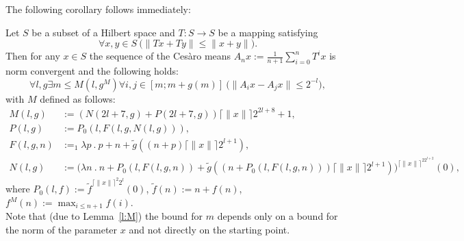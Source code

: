 The following corollary follows immediately:
\begin{cor} \label{c:fin21}
Let $S$ be a subset of a Hilbert space and $T:S\to S$
be a mapping satisfying
\[
\forall x,y\in S\ \big(\| Tx + Ty \| \leq \|x + y\|\big).
\]
Then for any $x\in S$ the sequence of the Ces{\`a}ro means
$
A_nx:=\frac{1}{n+1}\sum^{n}_{i=0} T^i x
$
is norm convergent and the following holds:
\[
\forall l,g \exists m\leq M(l,g^M)\forall i,j\in[m;m+g(m)]\ \big( \|A_{i}x-A_{j}x\|\leq 2^{-l}\big ),
\]
with $M$ defined as follows:
\begin{align*}
M(l,g)&:=(N( 2l+7, g) + P( 2l+7, g)){\lceil \|x\| \rceil}2^{2l+8}+1,\\
P(l,g)&:=P_0(l,F(l,g,N(l,g))),\\
F(l,g,n) &:=_1 \lambda p\ .\ p+n+\tilde g((n + p){\lceil \|x\| \rceil}2^{l+1}),\\
N(l,g)&:=\big({\lambda n\ .\ n+P_0(l,F(l,g,n))+\tilde g((n + P_0(l,F(l,g,n))){\lceil \|x\| \rceil}2^{l+1}) } \big)^{{\lceil \|x\| \rceil}^22^{l+2}}(0),
\end{align*}
where $P_0(l,f):=\tilde f^{ {\lceil \|x\| \rceil}^2 2^l}(0)$, $\tilde f(n):=n+f(n)$, $f^M(n):=\max_{i\leq n+1} f(i)$.\\

Note that (due to Lemma~\ref{l:M}) the bound for $m$ depends only on a bound for the norm of the
parameter $x$ and not directly on the starting point.
\end{cor}

